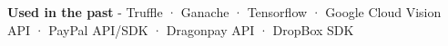 \begin{cventries}
{\begin{cvitems}
        \item {\textbf{Used in the past} \hspace{0.03cm} - \hspace{0.03cm} Truffle \hspace{0.03cm} · \hspace{0.03cm} Ganache \hspace{0.03cm} · \hspace{0.03cm} Tensorflow \hspace{0.03cm} · \hspace{0.03cm} Google Cloud Vision API \hspace{0.03cm} · \hspace{0.03cm} PayPal API/SDK \hspace{0.03cm} · \hspace{0.03cm} Dragonpay API \hspace{0.03cm} · \hspace{0.03cm} DropBox SDK \\} %
      \end{cvitems}
    }

\end{cventries}